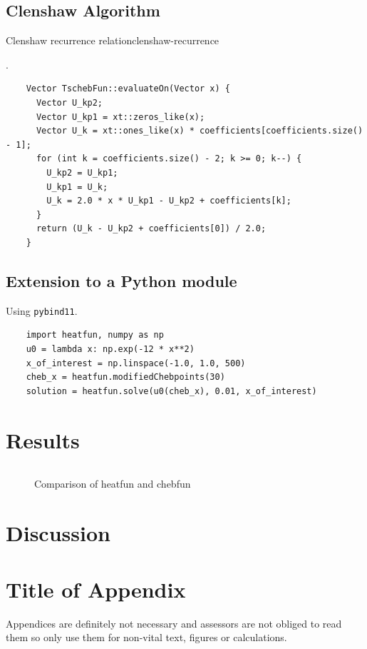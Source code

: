 \documentclass[12pt, a4paper]{article}
\begin{document}
  \subsection{Clenshaw Algorithm}
  \begin{theorem}{Clenshaw recurrence relation}{clenshaw-recurrence}
  \end{theorem}
  \parencite[172-178]{art-of-sci-comp}.

  \begin{verbatim}
    Vector TschebFun::evaluateOn(Vector x) {
      Vector U_kp2;
      Vector U_kp1 = xt::zeros_like(x);
      Vector U_k = xt::ones_like(x) * coefficients[coefficients.size() - 1];
      for (int k = coefficients.size() - 2; k >= 0; k--) {
        U_kp2 = U_kp1;
        U_kp1 = U_k;
        U_k = 2.0 * x * U_kp1 - U_kp2 + coefficients[k];
      }
      return (U_k - U_kp2 + coefficients[0]) / 2.0;
    }
  \end{verbatim}

  \subsection{Extension to a Python module}
  Using \texttt{pybind11}.

  \begin{verbatim}
    import heatfun, numpy as np
    u0 = lambda x: np.exp(-12 * x**2)
    x_of_interest = np.linspace(-1.0, 1.0, 500)
    cheb_x = heatfun.modifiedChebpoints(30)
    solution = heatfun.solve(u0(cheb_x), 0.01, x_of_interest)
  \end{verbatim}

  \section{Results}
  \inputminted{matlab}{../analysis/heatfun.m}

  \begin{figure}[H]
    \centering
    \caption{Comparison of heatfun and chebfun}
  \end{figure}

  \section{Discussion}

  \printbibliography

  \appendix
  \section{Title of Appendix}
  Appendices are definitely not necessary and assessors are not obliged to read them so only use them for non-vital text, figures or calculations.
\end{document}
